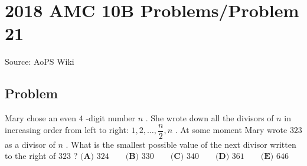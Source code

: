 \documentclass[12pt]{article}
\begin{document}
\section*{{2018 AMC 10B Problems/Problem 21}}
Source: AoPS Wiki

\subsection*{Problem}
Mary chose an even $4$ -digit number $n$ . She wrote down all the divisors of $n$ in increasing order from left to right: $1,2,\ldots,\dfrac{n}{2},n$ . At some moment Mary wrote $323$ as a divisor of $n$ . What is the smallest possible value of the next divisor written to the right of $323$ ? $\textbf{(A) } 324 \qquad \textbf{(B) } 330 \qquad \textbf{(C) } 340 \qquad \textbf{(D) } 361 \qquad \textbf{(E) } 646$
\end{document}
